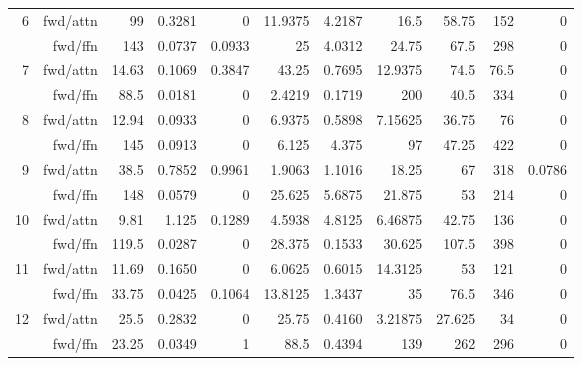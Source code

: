 \begin{table*}[t]
\begin{center}
\begin{tiny}
\begin{sc}
\begin{tabular}{rrrrrrrrrrr}
\midrule
\multirow{2}{*}{6}                    & fwd/attn             & 99    & 0.3281 & 0      & 11.9375 & 4.2187  & 16.5       & 58.75   & 152    & 0      \\
                     & fwd/ffn              & 143   & 0.0737 & 0.0933 & 25      & 4.0312  & 24.75      & 67.5    & 298    & 0      \\
\midrule
\multirow{2}{*}{7}                    & fwd/attn             & 14.63 & 0.1069 & 0.3847 & 43.25   & 0.7695  & 12.9375    & 74.5    & 76.5   & 0      \\
                     & fwd/ffn              & 88.5  & 0.0181 & 0      & 2.4219  & 0.1719  & 200        & 40.5    & 334    & 0      \\
\midrule
\multirow{2}{*}{8}                     & fwd/attn             & 12.94 & 0.0933 & 0      & 6.9375  & 0.5898  & 7.15625    & 36.75   & 76     & 0      \\
                     & fwd/ffn              & 145   & 0.0913 & 0      & 6.125   & 4.375   & 97         & 47.25   & 422    & 0      \\
\midrule
\multirow{2}{*}{9}                    & fwd/attn             & 38.5  & 0.7852 & 0.9961 & 1.9063  & 1.1016  & 18.25      & 67      & 318    & 0.0786 \\
                     & fwd/ffn              & 148   & 0.0579 & 0      & 25.625  & 5.6875  & 21.875     & 53      & 214    & 0      \\
\midrule
\multirow{2}{*}{10}                    & fwd/attn             & 9.81  & 1.125  & 0.1289 & 4.5938  & 4.8125  & 6.46875    & 42.75   & 136    & 0      \\
                     & fwd/ffn              & 119.5 & 0.0287 & 0      & 28.375  & 0.1533  & 30.625     & 107.5   & 398    & 0      \\
\midrule
\multirow{2}{*}{11}                    & fwd/attn             & 11.69 & 0.1650 & 0      & 6.0625  & 0.6015  & 14.3125    & 53      & 121    & 0      \\
                     & fwd/ffn              & 33.75 & 0.0425 & 0.1064 & 13.8125 & 1.3437  & 35         & 76.5    & 346    & 0      \\
\midrule
\multirow{2}{*}{12}                    & fwd/attn             & 25.5  & 0.2832 & 0      & 25.75   & 0.4160  & 3.21875    & 27.625  & 34     & 0      \\
                     & fwd/ffn              & 23.25 & 0.0349 & 1      & 88.5    & 0.4394  & 139        & 262     & 296    & 0      \\

\end{tabular}
\end{sc}
\end{tiny}
\end{center}
\end{table*}
